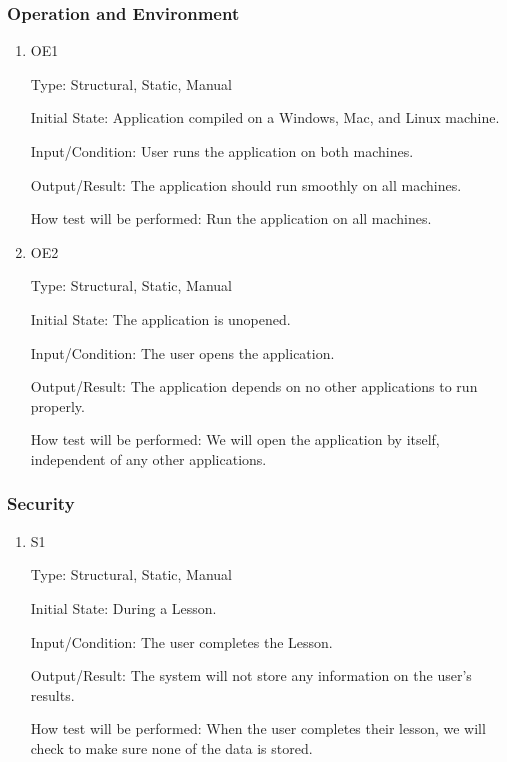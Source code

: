 \documentclass[12pt, titlepage]{article}
\begin{document}
\subsubsection{Operation and Environment}
\begin{enumerate}

\item{{\color{cyan} OE1}\\}

Type: Structural, Static, Manual
					
Initial State: Application compiled on a Windows, {\color{cyan}Mac}, and Linux machine.
					
Input/Condition: User runs the application on both machines.
					
Output/Result: The application should run smoothly on {\color{cyan} all} machines.
					
How test will be performed: Run the application on {\color{cyan}all} machines.

\item{{\color{cyan}OE2}}

Type: Structural, Static, Manual
					
Initial State: The application is unopened.
					
Input/Condition: The user opens the application.
					
Output/Result: The application depends on no other applications to run properly.
					
How test will be performed: We will open the application by itself, independent of any other applications.

\end{enumerate}

\subsubsection{Security}
\begin{enumerate}

\item{{\color{cyan}S1}\\}

Type: Structural, Static, Manual
					
Initial State: During a Lesson.
					
Input/Condition: The user completes the Lesson.
					
Output/Result: The system will not store any information on the user's results. 
					
How test will be performed: When the user completes their lesson, we will check to make sure none of the data is stored.

\end{enumerate}
\end{document}
